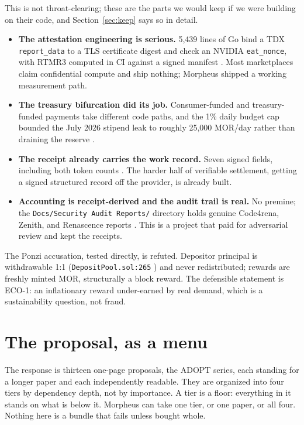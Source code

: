 \documentclass[11pt,a4paper]{article}
\newcommand{\code}[1]{\texttt{\small #1}}
\newcommand{\prov}[1]{{\color{muted}\footnotesize\sffamily[#1]}}
\begin{document}
This is not throat-clearing; these are the parts we would keep if we were building on their
code, and Section~\ref{sec:keep} says so in detail.

\begin{itemize}
  \item \textbf{The attestation engineering is serious.} 5,439 lines of Go bind a TDX
    \code{report\_data} to a TLS certificate digest and check an NVIDIA \code{eat\_nonce},
    with RTMR3 computed in CI against a signed manifest \prov{verified}. Most marketplaces
    claim confidential compute and ship nothing; Morpheus shipped a working measurement path.
  \item \textbf{The treasury bifurcation did its job.} Consumer-funded and treasury-funded
    payments take different code paths, and the 1\% daily budget cap bounded the July 2026
    stipend leak to roughly 25,000 MOR/day rather than draining the reserve \prov{verified}.
  \item \textbf{The receipt already carries the work record.} Seven signed fields, including
    both token counts \prov{verified}. The harder half of verifiable settlement, getting a
    signed structured record off the provider, is already built.
  \item \textbf{Accounting is receipt-derived and the audit trail is real.} No premine; the
    \code{Docs/Security Audit Reports/} directory holds genuine Code4rena, Zenith, and
    Renascence reports \prov{verified}. This is a project that paid for adversarial review and
    kept the receipts.
\end{itemize}

The Ponzi accusation, tested directly, is refuted. Depositor principal is withdrawable 1:1
(\code{DepositPool.sol:265} \prov{verified}) and never redistributed; rewards are freshly
minted MOR, structurally a block reward. The defensible statement is ECO-1: an inflationary
reward under-earned by real demand, which is a sustainability question, not fraud.

\section{The proposal, as a menu}
\label{sec:menu}

The response is thirteen one-page proposals, the ADOPT series, each standing for a longer
paper and each independently readable. They are organized into four tiers by dependency depth,
not by importance. A tier is a floor: everything in it stands on what is below it. Morpheus can
take one tier, or one paper, or all four. Nothing here is a bundle that fails unless bought
whole.
\end{document}
